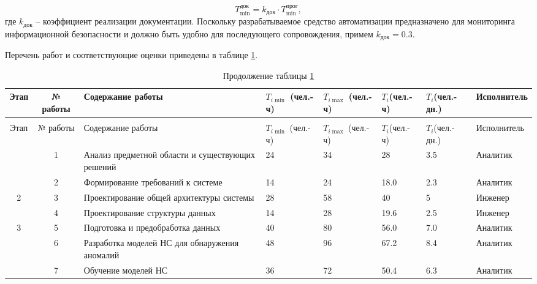 \begin{equation}\label{eq:Tdoc}
T_{\min}^{\text{док}} = k_{\text{док}}\cdot T_{\min}^{\text{прог}},
\end{equation}
где $k_{\text{док}}$ -- коэффициент реализации документации. Поскольку разрабатываемое средство автоматизации предназначено для мониторинга информационной безопасности и должно быть удобно для последующего сопровождения, примем $k_{\text{док}} = 0.3$.

Перечень работ и соответствующие оценки приведены в таблице \ref{tab:tasks_trud}.

{
\fontsize{10}{10}\selectfont
\setlength{\tabcolsep}{3pt}

\begin{longtable}{|c|c|p{4cm}|p{1.6cm}|p{1.6cm}|p{1.5cm}|p{1.6cm}|p{2.5cm}|}
    \caption{Перечень работ} \label{tab:tasks_trud} \\
    \hline
    Этап & № работы & Содержание работы & $T_{i\min}$ (чел.-ч) & $T_{i\max}$ (чел.-ч) & $T_i$\newline(чел.-ч) & $T_i$\newline(чел.-дн.) & Исполнитель \\
    \hline
    \endfirsthead

    \caption*{Продолжение таблицы \ref{tab:tasks_trud}}\\ \hline
    Этап & № работы & Содержание работы & $T_{i\min}$ (чел.-ч) & $T_{i\max}$ (чел.-ч) & $T_i$\newline(чел.-ч) & $T_i$\newline(чел.-дн.) & Исполнитель \\ \hline
    \endhead

    \hline
    \endfoot

    \hline
    \endlastfoot

    \multirow{2}{*}{1}
        & 1  & Анализ предметной области и существующих решений
        & 24 & 34  & 28  & 3.5  & Аналитик \\ \cline{2-8}
        & 2  & Формирование требований к системе
        & 14 & 24  & 18.0  & 2.3  & Аналитик \\ \hline

    \multirow{2}{*}{2}
        & 3  & Проектирование общей архитектуры системы
        & 28 & 58  & 40 & 5  & Инженер \\ \cline{2-8}
        & 4  & Проектирование структуры данных
        & 14 & 28  & 19.6  & 2.5  & Инженер \\ \hline

    \multirow{3}{*}{3}
        & 5  & Подготовка и предобработка данных
        & 40 & 80  & 56.0  & 7.0  & Аналитик \\ \cline{2-8}
        & 6  & Разработка моделей НС для обнаружения аномалий
        & 48 & 96  & 67.2  & 8.4  & Аналитик \\ \cline{2-8}
        & 7 & Обучение моделей НС
        & 36 & 72  & 50.4  & 6.3  & Аналитик \\ \hline


\end{longtable}}
